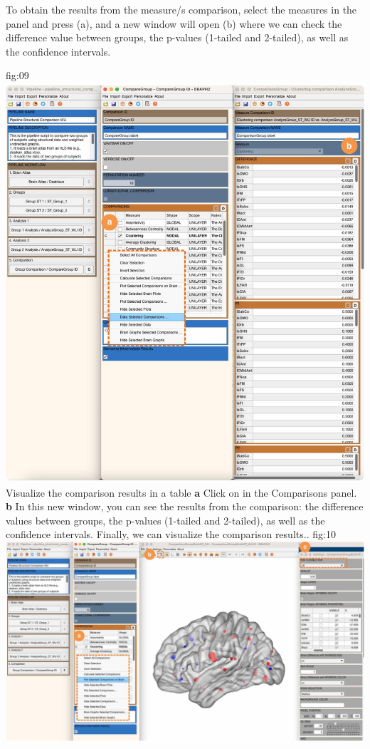 \documentclass[justified]{tufte-handout}
\begin{document}
To obtain the results from the measure/s comparison, select the measures in the  panel and press ({a}), and a new window will open ({b}) where we can check the difference value between groups, the p-values (1-tailed and 2-tailed), as well as the confidence intervals.

	{fig:09}
	{
	\includegraphics{fig09.jpg}
	}
	{Visualize the comparison results in a table}
	{
	{\bf a} Click on  in the Comparisons panel.
	{\bf b} In this new window, you can see the results from the comparison: the difference values between groups, the p-values (1-tailed and 2-tailed), as well as the confidence intervals.
	}
Finally, we can visualize the comparison results..
	{fig:10}
	{
	\includegraphics{fig10.jpg}
	}
\end{document}
